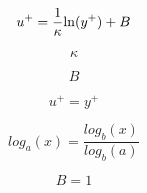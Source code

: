 

\begin{equation}
u^+ = \frac{1}{\kappa}{\rm ln}(y^+) + B
\end{equation}

\begin{equation}
\kappa
\end{equation}

\begin{equation}
B
\end{equation}

\begin{equation}
u^+ = y^+
\end{equation}

\begin{equation}
log_a(x) = \frac{log_b(x)}{log_b(a)}
\end{equation}

\begin{equation}
B=1
\end{equation}


